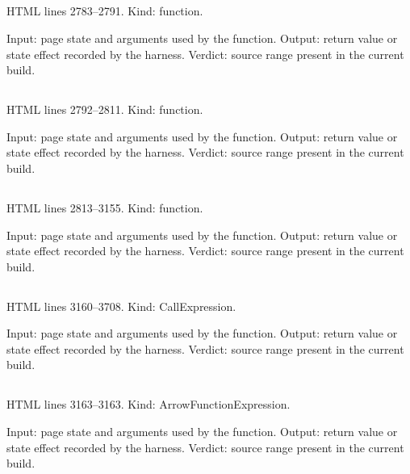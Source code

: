 \subsection*{\texttt{}}
\label{vf_80_ownsResult}
HTML lines 2783--2791. Kind: function.

Input: page state and arguments used by the function.
Output: return value or state effect recorded by the harness.
Verdict: source range present in the current build.

\subsection*{\texttt{}}
\label{vf_81_analysisResults}
HTML lines 2792--2811. Kind: function.

Input: page state and arguments used by the function.
Output: return value or state effect recorded by the harness.
Verdict: source range present in the current build.

\subsection*{\texttt{}}
\label{vf_82_decodeIxo}
HTML lines 2813--3155. Kind: function.

Input: page state and arguments used by the function.
Output: return value or state effect recorded by the harness.
Verdict: source range present in the current build.

\subsection*{\texttt{}}
\label{vf_83_EDS}
HTML lines 3160--3708. Kind: CallExpression.

Input: page state and arguments used by the function.
Output: return value or state effect recorded by the harness.
Verdict: source range present in the current build.

\subsection*{\texttt{\detokenize{$}}}
\label{vf_84__}
HTML lines 3163--3163. Kind: ArrowFunctionExpression.

Input: page state and arguments used by the function.
Output: return value or state effect recorded by the harness.
Verdict: source range present in the current build.


